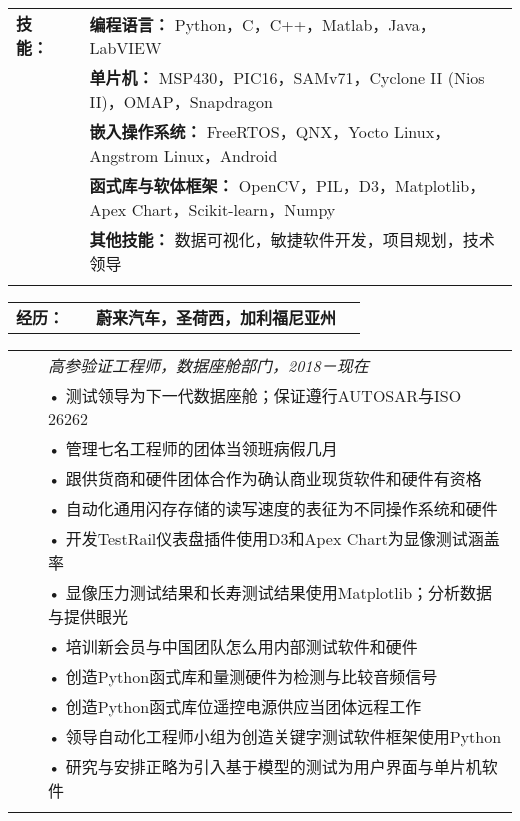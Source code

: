 \documentclass{minimal}
\begin{document}
\begin{CJK*}{UTF8}{gbsn}


\begin{center}
\fontsize{14}{12.8}\selectfont
\name\\
\fontsize{10}{12}\selectfont
\address\\
\phone\\
\email\\
\github\\
\end{center}
\vspace{0.5cm}

\begin{tabular}{ p{1.5cm} p{1cm} p{16cm} }
\textbf{技能：} & & \textbf{编程语言：} Python，C，C++，Matlab，Java，LabVIEW\\
& & \textbf{单片机：} MSP430，PIC16，SAMv71，Cyclone II (Nios II)，OMAP，Snapdragon\\
& & \textbf{嵌入操作系统：} FreeRTOS，QNX，Yocto Linux，Angstrom Linux，Android\\
& & \textbf{函式库与软体框架：} OpenCV，PIL，D3，Matplotlib，Apex Chart，Scikit-learn，Numpy\\
& & \textbf{其他技能：} 数据可视化，敏捷软件开发，项目规划，技术领导\\
& & \\
\end{tabular}

\begin{tabular}{ p{1.5cm} p{1cm} p{16cm} >{\raggedleft\arraybackslash}p{3cm} }
\textbf{经历：} & & \textbf{蔚来汽车，圣荷西，加利福尼亚州} & \\
\end{tabular}

\begin{tabular}{ p{1.5cm} p{1cm} p{16cm} }
& & \textit{高参验证工程师，数据座舱部门，2018－现在}\\
& & • 测试领导为下一代数据座舱；保证遵行AUTOSAR与ISO 26262\\
& & • 管理七名工程师的团体当领班病假几月\\
& & • 跟供货商和硬件团体合作为确认商业现货软件和硬件有资格\\
& & • 自动化通用闪存存储的读写速度的表征为不同操作系统和硬件\\
& & • 开发TestRail仪表盘插件使用D3和Apex Chart为显像测试涵盖率\\
& & • 显像压力测试结果和长寿测试结果使用Matplotlib；分析数据与提供眼光\\
& & • 培训新会员与中国团队怎么用内部测试软件和硬件\\
& & • 创造Python函式库和量测硬件为检测与比较音频信号\\
& & • 创造Python函式库位遥控电源供应当团体远程工作\\
& & • 领导自动化工程师小组为创造关键字测试软件框架使用Python\\
& & • 研究与安排正略为引入基于模型的测试为用户界面与单片机软件\\
& & \\
\end{tabular}


\end{CJK*}
\end{document}
